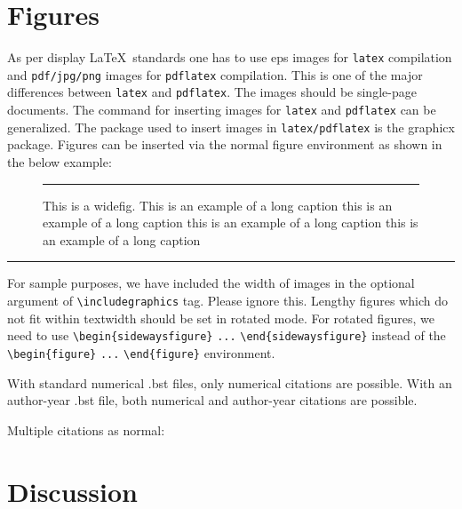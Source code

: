 \documentclass[unnumsec,webpdf,contemporary,large]{oup-authoring-template}%
\theoremstyle{thmstyleone}%
\theoremstyle{thmstyletwo}%
\theoremstyle{thmstylethree}%
\begin{document}
\section{Figures}\label{sec6}

As per display \LaTeX\ standards one has to use eps images for \verb+latex+ compilation and \verb+pdf/jpg/png+ images for
\verb+pdflatex+ compilation. This is one of the major differences between \verb+latex+
and \verb+pdflatex+. The images should be single-page documents. The command for inserting images
for \verb+latex+ and \verb+pdflatex+ can be generalized. The package used to insert images in \verb+latex/pdflatex+ is the
graphicx package. Figures can be inserted via the normal figure environment as shown in the below example:


\begin{figure}[!t]%
\centering
{\color{black!20}\rule{213pt}{37pt}}
\caption{This is a widefig. This is an example of a long caption this is an example of a long caption  this is an example of a long caption this is an example of a long caption}\label{fig1}
\end{figure}

\begin{figure*}[!t]%
\centering
{\color{black!20}\rule{438pt}{74pt}}
\caption{This is a widefig. This is an example of a long caption this is an example of a long caption  this is an example of a long caption this is an example of a long caption}\label{fig2}
\end{figure*}

For sample purposes, we have included the width of images in the
optional argument of \verb+\includegraphics+ tag. Please ignore this.
Lengthy figures which do not fit within textwidth should be set in rotated mode. For rotated figures, we need to use \verb+\begin{sidewaysfigure}+ \verb+...+ \verb+\end{sidewaysfigure}+ instead of the \verb+\begin{figure}+ \verb+...+ \verb+\end{figure}+ environment.



With standard numerical .bst files, only numerical citations are possible.
With an author-year .bst file, both numerical and author-year citations are possible.



\noindent
Multiple citations as normal:


\section{Discussion}\label{discussion}
\end{document}
